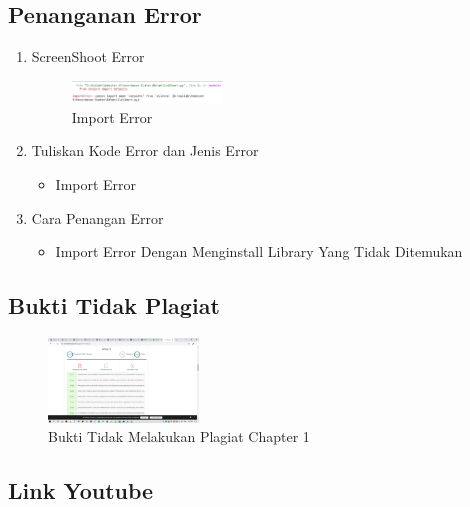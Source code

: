 \subsection{Penanganan Error}
\begin{enumerate}
	\item ScreenShoot Error
	\begin{figure}[H]
		\includegraphics[width=4cm]{figures/1174075/1/error/1.png}
		\centering
		\caption{Import Error}
	\end{figure}

	\item Tuliskan Kode Error dan Jenis Error
	\begin{itemize}
		\item Import Error
	\end{itemize}
	\item Cara Penangan Error
	\begin{itemize}
		\item Import Error
		\hfill\break
		Dengan Menginstall Library Yang Tidak Ditemukan
	\end{itemize}
\end{enumerate}

\subsection{Bukti Tidak Plagiat}
\begin{figure}[H]
	\includegraphics[width=4cm]{figures/1174075/1/plagiat/plagiat.png}
	\centering
	\caption{Bukti Tidak Melakukan Plagiat Chapter 1}
\end{figure}

\subsection{Link Youtube}


